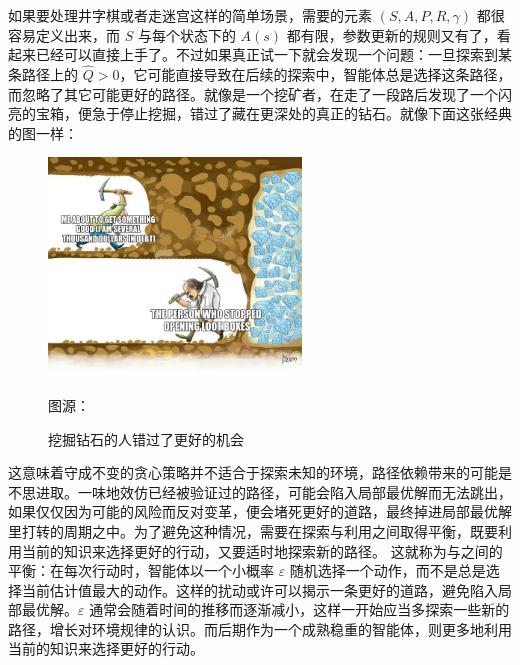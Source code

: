 如果要处理井字棋或者走迷宫这样的简单场景，需要的元素 $(S, A, P, R, \gamma)$ 都很容易定义出来，而 $S$ 与每个状态下的 $A(s)$ 都有限，参数更新的规则又有了，看起来已经可以直接上手了。不过如果真正试一下就会发现一个问题：一旦探索到某条路径上的 $\hat Q > 0$，它可能直接导致在后续的探索中，智能体总是选择这条路径，而忽略了其它可能更好的路径。就像是一个挖矿者，在走了一段路后发现了一个闪亮的宝箱，便急于停止挖掘，错过了藏在更深处的真正的钻石。就像下面这张经典的图一样：
\begin{figure}[H]
\centering
\includegraphics[width=0.6\textwidth]{img/digging_for_diamonds.png}
\caption{挖掘钻石的人错过了更好的机会}
{图源：}
\end{figure}

这意味着守成不变的贪心策略并不适合于探索未知的环境，路径依赖带来的可能是不思进取。一味地效仿已经被验证过的路径，可能会陷入局部最优解而无法跳出，如果仅仅因为可能的风险而反对变革，便会堵死更好的道路，最终掉进局部最优解里打转的周期之中。为了避免这种情况，需要在探索与利用之间取得平衡，既要利用当前的知识来选择更好的行动，又要适时地探索新的路径。
这就称为与之间的平衡：在每次行动时，智能体以一个小概率 $\varepsilon$ 随机选择一个动作，而不是总是选择当前估计值最大的动作。这样的扰动或许可以揭示一条更好的道路，避免陷入局部最优解。$\varepsilon$ 通常会随着时间的推移而逐渐减小，这样一开始应当多探索一些新的路径，增长对环境规律的认识。而后期作为一个成熟稳重的智能体，则更多地利用当前的知识来选择更好的行动。

